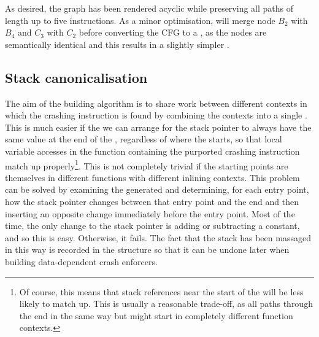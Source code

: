 As desired, the graph has been rendered acyclic while preserving all
paths of length up to five instructions.  As a minor optimisation,
{\implementation} will merge node $B_2$ with $B_4$ and $C_3$ with
$C_2$ before converting the CFG to a \StateMachine, as the nodes are
semantically identical and this results in a slightly simpler
\StateMachine.


\subsection{Stack canonicalisation}


The aim of the {\StateMachine} building algorithm is to share work
between different contexts in which the crashing instruction is found
by combining the contexts into a single {\StateMachine}.  This is much
easier if the we can arrange for the stack pointer to always have the
same value at the end of the {\StateMachine}, regardless of where the
{\StateMachine} starts, so that local variable accesses in the
function containing the purported crashing instruction match up
properly\footnote{Of course, this means that stack references near the
  start of the {\StateMachine} will be less likely to match up.  This
  is usually a reasonable trade-off, as all paths through the
  {\StateMachine} end in the same way but might start in completely
  different function contexts.  }.  This is not
completely trivial if the starting points are themselves in different
functions with different inlining contexts.  This problem can be
solved by examining the generated {\StateMachine} and determining, for
each entry point, how the stack pointer changes between that entry
point and the end and then inserting an opposite change immediately
before the entry point.  Most of the time, the only change to the
stack pointer is adding or subtracting a constant, and so this is
easy.  Otherwise, it fails.  The fact that the stack has been massaged
in this way is recorded in the {\StateMachine} structure so that it
can be undone later when building data-dependent crash enforcers.



